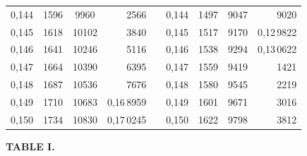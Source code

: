 \begin{tabular}{|c|c|c|r|@{}p{9pt}@{}|c|c|c|r|}
0,144 & 1596 & 9960 & 2566 &  & 0,144 & 1497 & 9047 & 9020 \\
0,145 & 1618 & 10102 & 3840 &  & 0,145 & 1517 & 9170 & 0,12\,9822 \\[3pt]
0,146 & 1641 & 10246 & 5116 &  & 0,146 & 1538 & 9294 & 0,13\,0622 \\
0,147 & 1664 & 10390 & 6395 &  & 0,147 & 1559 & 9419 & 1421 \\
0,148 & 1687 & 10536 & 7676 &  & 0,148 & 1580 & 9545 & 2219 \\
0,149 & 1710 & 10683 & 0,16\,8959 &  & 0,149 & 1601 & 9671 & 3016 \\
0,150 & 1734 & 10830 & 0,17\,0245 &  & 0,150 & 1622 & 9798 & 3812 \\
\hline
\end{tabular}\par
\endgroup
\clearpage
{}
\begingroup
\centering
\fontsize{9}{9}\selectfont
\setlength{\tabcolsep}{6pt}
\renewcommand{\arraystretch}{1}
\setlength{\parskip}{0pt}
\textbf{TABLE I.}
\par\vspace{7pt}
